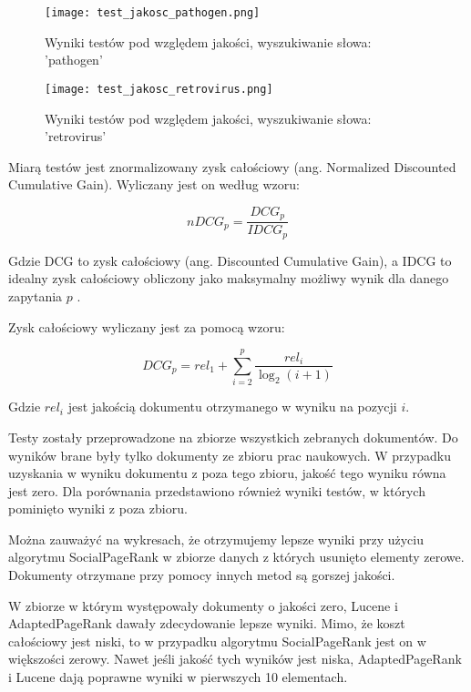 \begin{figure}[tb]
    \centering
    \texttt{[image: test\_jakosc\_pathogen.png]}
    \caption{Wyniki testów pod względem jakości, wyszukiwanie słowa: 'pathogen'}
    \label{fig:jakosc-pathogen}

\end{figure}

\begin{figure}[tb]
    \centering
    \texttt{[image: test\_jakosc\_retrovirus.png]}
    \caption{Wyniki testów pod względem jakości, wyszukiwanie słowa: 'retrovirus'}
    \label{fig:jakosc-retrovirus}

\end{figure}


Miarą testów jest znormalizowany zysk całościowy (ang. Normalized Discounted Cumulative Gain). Wyliczany jest on według wzoru:

\begin{equation}
   nDCG_{p} = \frac{DCG_{p}}{IDCG_{p}} 
\end{equation}

Gdzie DCG to zysk całościowy (ang. Discounted Cumulative Gain), a IDCG to idealny zysk całościowy obliczony jako maksymalny możliwy wynik dla danego zapytania $p$ .

Zysk całościowy wyliczany jest za pomocą wzoru:

\begin{equation}
    DCG_{p} = rel_{1} + \sum_{i=2}^{p} \frac{rel_{i}}{\log_{2}(i+1)} 
\end{equation}

Gdzie $rel_i$ jest jakością dokumentu otrzymanego w wyniku na pozycji $i$.

Testy zostały przeprowadzone na zbiorze wszystkich zebranych dokumentów. Do wyników brane były tylko dokumenty ze zbioru prac naukowych. W przypadku uzyskania w wyniku dokumentu z poza tego zbioru, jakość tego wyniku równa jest zero. Dla porównania przedstawiono również wyniki testów, w których pominięto wyniki z poza zbioru.

Można zauważyć na wykresach, że otrzymujemy lepsze wyniki przy użyciu algorytmu SocialPageRank w zbiorze danych z których usunięto elementy zerowe. Dokumenty otrzymane przy pomocy innych metod są gorszej jakości. 

W zbiorze w którym występowały dokumenty o jakości zero, Lucene i AdaptedPageRank dawały zdecydowanie lepsze wyniki. Mimo, że koszt całościowy jest niski, to w przypadku algorytmu SocialPageRank jest on w większości zerowy. Nawet jeśli jakość tych wyników jest niska, AdaptedPageRank i Lucene dają poprawne wyniki w pierwszych 10 elementach.

